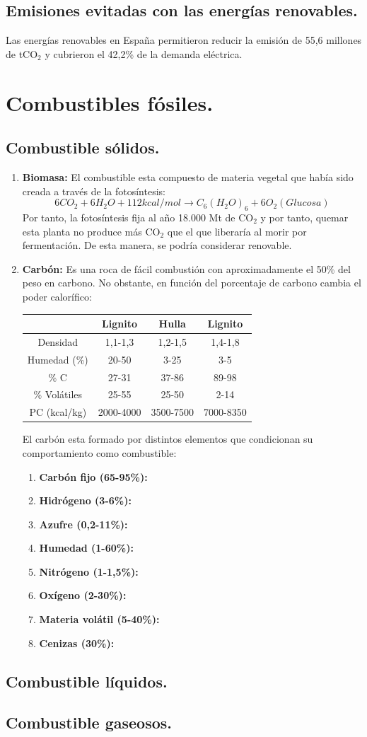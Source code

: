 \subsection{Emisiones evitadas con las energías renovables.}
Las energías renovables en España permitieron reducir la emisión de 55,6 millones de tCO$_2$ y cubrieron el 42,2\% de la demanda eléctrica.
\newpage
\section{Combustibles fósiles.}
\subsection{Combustible sólidos.}
\begin{enumerate}
	\item \textbf{Biomasa:}
		El combustible esta compuesto de materia vegetal que había sido creada a través de la fotosíntesis:
		\[6 CO_2 + 6 H_2O + 112 kcal/mol \rightarrow C_6 (H_2O)_6 + 6 O_2 ( Glucosa)\]
		Por tanto, la fotosíntesis fija al año 18.000 Mt de CO$_2$ y por tanto, quemar esta planta no produce más CO$_2$ que el que liberaría al morir por fermentación. De esta manera, se podría considerar renovable.
	\item \textbf{Carbón:}
		Es una roca de fácil combustión con aproximadamente el 50\% del peso en carbono. No obstante, en función del porcentaje de carbono cambia el poder calorífico:
		\begin{table}[H]
			\centering
			\renewcommand{\arraystretch}{1.1}
			\begin{tabular}{cccc}
				\hline
				&\textbf{Lignito} & \textbf{Hulla} & \textbf{Lignito}\\  
				\hline
			Densidad &  1,1-1,3&1,2-1,5  &1,4-1,8\\ 
			Humedad (\%) &20-50  &3-25  &3-5\\ 
			\% C & 27-31 &  37-86&89-98\\ 
			\% Volátiles &25-55  &25-50  &2-14\\ 
			PC (kcal/kg) &  2000-4000&3500-7500  &7000-8350\\ 
				\hline
			\end{tabular}
		\end{table}
		El carbón esta formado por distintos elementos que condicionan su comportamiento como combustible:
		\begin{enumerate}
			\item \textbf{Carbón fijo (65-95\%):}
			\item \textbf{Hidrógeno (3-6\%):}
			\item \textbf{Azufre (0,2-11\%):}
			\item \textbf{Humedad (1-60\%):}
			\item \textbf{Nitrógeno (1-1,5\%):}
			\item \textbf{Oxígeno (2-30\%):}
			\item \textbf{Materia volátil (5-40\%):}
			\item \textbf{Cenizas (30\%):}		
		\end{enumerate}
		
\end{enumerate}
\subsection{Combustible líquidos.}
\subsection{Combustible gaseosos.}